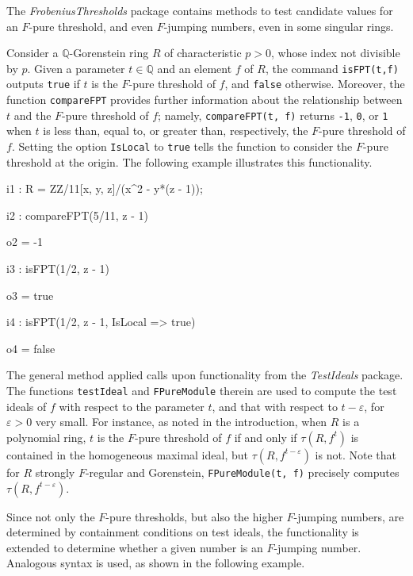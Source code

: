 \documentclass{amsart}
\begin{document}
The \emph{FrobeniusThresholds} package contains methods to
 test candidate values for an $F$-pure threshold, and even $F$-jumping numbers, even in some singular rings.

Consider a  $\mathbb{Q}$-Gorenstein ring $R$ of characteristic $p>0$, whose index not divisible by $p$.
Given a parameter $t \in \mathbb{Q}$ and an element $f$ of $R$, the command \texttt{isFPT(t,f)} outputs \texttt{true} if $t$ is the $F$-pure threshold of $f$, and \texttt{false} otherwise.
Moreover, the function \texttt{compareFPT} provides further information about the relationship between $t$ and the $F$-pure threshold of $f$; namely,
\texttt{compareFPT(t, f)} returns {\tt-1}, \texttt{0}, or \texttt{1} when $t$ is less than, equal to, or greater than, respectively, the $F$-pure threshold of $f$.  Setting the option \texttt{IsLocal} to \texttt{true} tells the function to consider the $F$-pure threshold at the origin.  The following example illustrates this functionality.

\bigskip
{\small
{}
\begin{MyVerbatim}
i1 : R = ZZ/11[x, y, z]/(x^2 - y*(z - 1));

i2 : compareFPT(5/11, z - 1)

o2 = -1

i3 : isFPT(1/2, z - 1)

o3 = true

i4 : isFPT(1/2, z - 1, IsLocal => true)

o4 = false
\end{MyVerbatim}
}
\bigskip

The general method applied calls upon functionality from the \emph{TestIdeals} package.  The functions \texttt{testIdeal} and \texttt{FPureModule} therein are used
to compute the test ideals of $f$ with respect to the parameter $t$, and that with respect to $t - \varepsilon$, for $\varepsilon>0$ very small. For instance, as noted in the introduction, when $R$ is a polynomial ring, $t$ is the $F$-pure threshold of $f$ if and only if $\tau(R, f^t)$ is contained in the homogeneous maximal ideal, but
$\tau(R, f^{t-\varepsilon})$ is not.
Note that for $R$ strongly $F$-regular and Gorenstein, \texttt{FPureModule(t, f)} precisely computes $\tau(R, f^{t-\varepsilon})$.


Since not only the $F$-pure thresholds, but also the higher $F$-jumping numbers, are determined by containment conditions on test ideals, the functionality is extended to determine whether a given number is an $F$-jumping number.
Analogous syntax is used, as shown in the following example.
\end{document}
